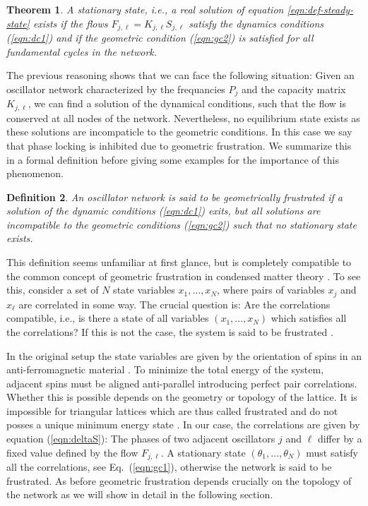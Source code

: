 \documentclass[10pt,aps,pre,preprint,superscriptaddress]{revtex4-1}
\newtheorem{thm}{Theorem}
\newtheorem{defn}[thm]{Definition}
\begin{document}
\begin{thm}
A stationary state, i.e., a real solution of equation \eqref{eqn:def-steady-state} exists 
if the flows $F_{j,\ell} = K_{j,\ell} S_{j,\ell}$
satisfy the dynamics conditions (\ref{eqn:dc1})  and if
the geometric condition (\ref{eqn:gc2}) is satisfied for
all fundamental cycles in the network.
\end{thm}



The previous reasoning shows that we can face the following
situation: Given an oscillator network characterized by the
frequancies $P_j$ and the capacity matrix $K_{j,\ell}$,
we can find a solution of the dynamical conditions, such that
the flow is conserved at all nodes of the network. Nevertheless,
no equilibrium state exists as these solutions are incompaticle 
to the geometric conditions. In this case we say that phase
locking is inhibited due to geometric frustration. We 
summarize this in a formal definition before giving some
examples for the importance of this phenomenon. 


\begin{defn}
An oscillator network is said to be {geometrically 
frustrated} if a solution of the dynamic conditions 
(\ref{eqn:dc1}) exits, but all solutions are incompatible
to the geometric conditions (\ref{eqn:gc2}) such 
that no stationary state exists.
\end{defn}


This definition seems unfamiliar at first glance, but is completely compatible 
to the common concept of geometric frustration in condensed matter theory 
\cite{Wann50,Toul80,Moes06}.
To see this, consider a set of $N$ state variables $x_1,\ldots,x_N$,
where pairs of variables $x_j$ and $x_\ell$ are correlated in some way.
The crucial question is: Are the correlations compatible, i.e., is there a state of 
all variables $(x_1,\ldots,x_N)$ which satisfies all the correlations? 
If this is not the case, the system is said to be frustrated \cite{Wolf03}.

In the original setup the state variables are given by the orientation of 
spins in an anti-ferromagnetic material \cite{Wann50}. To minimize the total
energy of the system, adjacent spins must be aligned anti-parallel 
introducing perfect pair correlations. Whether this is possible depends
on the geometry or topology of the lattice. It is impossible for triangular
lattices which are thus called frustrated and do not posses a unique 
minimum energy state \cite{Wann50,Toul80}. 
In our case, the correlations are given by equation (\ref{eqn:deltaS}): The 
phases of two adjacent oscillators $j$ and $\ell$ differ by a fixed value defined 
by the flow $F_{j,\ell}$. A stationary state $(\theta_1,\ldots,\theta_N)$ must
satisfy all the correlations, see Eq.~(\ref{eqn:gc1}), otherwise the network is 
said to be frustrated. As before geometric frustration depends crucially on the 
topology of the network as we will show in detail in the following section. 
\end{document}
